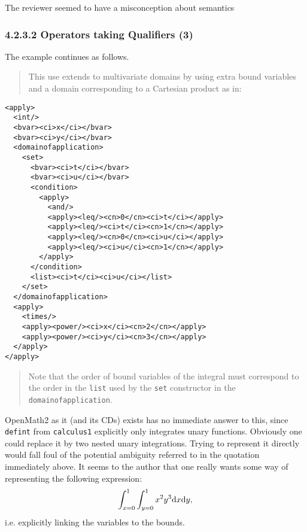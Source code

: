\documentclass{llncs}
\begin{document}
\begin{newpart}{The reviewer seemed to have a misconception about semantics}
\subsubsection{4.2.3.2 Operators taking Qualifiers (3)}\label{42323}
The example continues as follows.
\begin{quotation}\noindent
This use extends to multivariate domains by using extra bound variables and a
domain corresponding to a Cartesian product as in:
\end{quotation}
\begin{lstlisting}[language=MathML2]
<apply>
  <int/>
  <bvar><ci>x</ci></bvar>
  <bvar><ci>y</ci></bvar>
  <domainofapplication>
    <set>
      <bvar><ci>t</ci></bvar>
      <bvar><ci>u</ci></bvar>
      <condition>
        <apply>
          <and/>
          <apply><leq/><cn>0</cn><ci>t</ci></apply>
          <apply><leq/><ci>t</ci><cn>1</cn></apply>
          <apply><leq/><cn>0</cn><ci>u</ci></apply>
          <apply><leq/><ci>u</ci><cn>1</cn></apply>
        </apply>
      </condition>
      <list><ci>t</ci><ci>u</ci></list>
    </set>
  </domainofapplication>
  <apply>
    <times/>
    <apply><power/><ci>x</ci><cn>2</cn></apply>
    <apply><power/><ci>y</ci><cn>3</cn></apply>
  </apply>
</apply>
\end{lstlisting}
\begin{quotation}\noindent
Note that the order of bound variables of the integral must correspond to the
order in the {\tt list} used by the {\tt set} constructor in the {\tt
domainofapplication}. 
\end{quotation}
OpenMath2 as it (and its CDs) exists has no immediate answer to this, since
{\tt defint} from {\tt calculus1} explicitly only integrates unary functions.
Obviously one could replace it by two nested unary integrations. Trying to
represent it directly would fall foul of the potential ambiguity referred to
in the quotation immediately above. It seems to the author that one really
wants some way of representing the following expression:
\begin{equation}
\int_{x=0}^1\int_{y=0}^1x^2y^3{\rm d}x{\rm d}y,
\end{equation}
i.e. explicitly linking the variables to the bounds.

\end{newpart}
\end{document}
